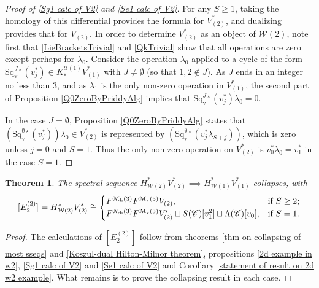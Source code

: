 \documentclass[11pt]{amsart} \renewcommand{\baselinestretch}{1.2}
\theoremstyle{plain}
\newtheorem{thm}{Theorem}[section]
\theoremstyle{definition}
\newcommand{\scrC}{\mathscr{C}}
\newcommand{\calU}{\mathcal{U}}
\newcommand{\calw}{\mathcal{W}}
\newcommand{\calmv}{\mathcal{M}\dver}
\newcommand{\calmh}{\mathcal{M}\dhor}
\newcommand{\CommOperad}{{\scrC}}
\newcommand{\E}[5]{[E^{#1}_{#2}#3]^{#4}_{#5}}
\newcommand{\dver}{_\mathrm{v}}
\newcommand{\dhor}{_\mathrm{h}}
\newcommand{\Sqvstar}[1]{\mathrm{Sq}\dver^{#1\star}}
\begin{document}
\begin{Calculations of HWn}
\begin{proof}[Proof of \ref{Sg1 calc of V2} and \ref{Se1 calc of V2}]
For any $S\geq1$, taking the homology of this differential provides the formula for $V^*_{(2)}$, and dualizing provides that for $V_{(2)}$.
In order to determine $V^*_{(2)}$ as an object of $\calw(2)$, note first that \ref{LieBracketsTrivial} and \ref{QkTrivial} show that all operations are zero except perhaps for $\lambda_0$. %
Consider the operation $\lambda_0$ applied to a cycle of the form $\Sqvstar{J}(v_{j}^*)\in K_{*}^{\calU(1)}V^*_{(1)}$ with $J\neq\emptyset$ (so that $1,2\notin J$). As $J$ ends in an integer no less than 3, and as $\lambda_1$ is the only non-zero operation in $V^*_{(1)}$, the second part of Proposition \ref{Q0ZeroByPriddyAlg} implies that $\Sqvstar{J}(v_{j}^*)\lambda_0=0$.

In the case $J=\emptyset$, Proposition \ref{Q0ZeroByPriddyAlg} states that $(\Sqvstar{\emptyset}(v_{j}^*))\lambda_0\in V^*_{(2)}$ is represented by $(\Sqvstar{\emptyset}(v_{j}^*\lambda_{S+j}))$, which is zero unless $j=0$ and $S=1$. Thus the only non-zero operation on $V^*_{(2)}$ is $v_0^*\lambda_0=v_1^*$ in the case $S=1$.
\end{proof}
\begin{thm}
\label{W2 to W1 collapse}
The spectral sequence $H^*_{\calw(2)}V^*_{(2)}\implies H^*_{\calw(1)}V^*_{(1)}$ collapses, with
\[\E{(2)}{2}{}{}{}=H^*_{\calw(2)}V^*_{(2)}\cong\begin{cases}
F^{\calmh(3)}F^{\calmv(3)}V_{(2)},&\textup{if }S\geq2;\\
F^{\calmh(3)}F^{\calmv(3)}V'_{(2)}\sqcup S(\CommOperad) [v_1^{2}]\sqcup \Lambda(\CommOperad)[v_0],&\textup{if }S=1.
\end{cases}
\]
\end{thm}
\begin{proof}
The calculations of $\E{(2)}{2}{}{}{}$ follow from  theorems \ref{thm on collapsing of most sseqs} and \ref{Koszul-dual Hilton-Milnor theorem}, propositions \ref{2d example in w2}, \ref{Sg1 calc of V2} and \ref{Se1 calc of V2}  and Corollary \ref{statement of result on 2d w2 example}. What remains is to prove the collapsing result in each case.


\end{proof}
\end{Calculations of HWn}
\end{document}
